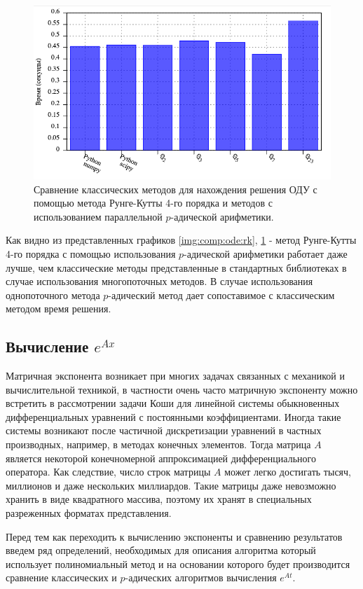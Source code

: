 \documentclass[master, och, diploma, times]{sty/SCWorks}
\theoremstyle{plain}
\theoremstyle{definition}
\numberwithin{equation}{section}
\begin{document}
\begin{figure}[H]
\centerline{\includegraphics[width=0.85\linewidth]{../gnuplot/multi/rk/multi.png}}
\caption{Сравнение классических методов для нахождения решения ОДУ с помощью метода Рунге-Кутты 4-го порядка и методов с использованием параллельной $p$-адической арифметики.}
\label{img:comp:ode:rk:multi}
\end{figure}

Как видно из представленных графиков \ref{img:comp:ode:rk}, \ref{img:comp:ode:rk:multi} - метод Рунге-Кутты 4-го порядка с помощью использования $p$-адической арифметики работает даже лучше, чем классические методы представленные в стандартных библиотеках в случае использования многопоточных методов. В случае использования однопоточного метода $p$-адический метод дает сопоставимое с классическим методом время решения.

\subsection{Вычисление $e^{Ax}$}

Матричная экспонента возникает при многих задачах связанных с механикой и вычислительной техникой, в частности очень часто матричную экспоненту можно встретить в рассмотрении задачи Коши для линейной системы обыкновенных дифференциальных уравнений с постоянными коэффициентами. Иногда такие системы возникают после частичной дискретизации уравнений в частных производных, например, в методах конечных элементов. Тогда матрица $A$ является некоторой конечномерной аппроксимацией дифференциального оператора. Как следствие, число строк матрицы $A$ может легко достигать тысяч, миллионов и даже нескольких миллиардов. Такие матрицы даже невозможно хранить в виде квадратного массива, поэтому их хранят в специальных разреженных форматах представления.

Перед тем как переходить к вычислению экспоненты и сравнению результатов введем ряд определений, необходимых для описания алгоритма который использует полиномиальный метод и на основании которого будет производится сравнение классических и $p$-адических алгоритмов вычисления $e^{At}$.
\end{document}
